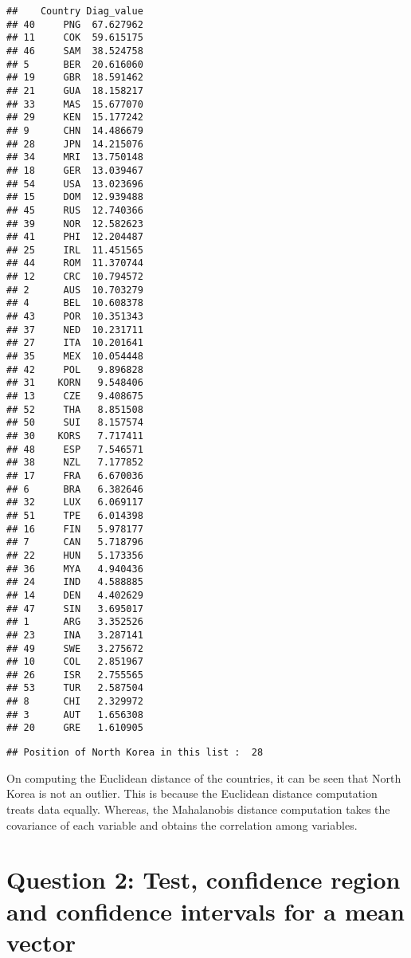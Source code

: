 \documentclass[]{article}
\newenvironment{Shaded}{\begin{snugshade}}{\end{snugshade}}
\newcommand{\KeywordTok}[1]{\textcolor[rgb]{0.13,0.29,0.53}{\textbf{#1}}}
\newcommand{\StringTok}[1]{\textcolor[rgb]{0.31,0.60,0.02}{#1}}
\newcommand{\OperatorTok}[1]{\textcolor[rgb]{0.81,0.36,0.00}{\textbf{#1}}}
\newcommand{\NormalTok}[1]{#1}
\begin{document}
\begin{verbatim}
##    Country Diag_value
## 40     PNG  67.627962
## 11     COK  59.615175
## 46     SAM  38.524758
## 5      BER  20.616060
## 19     GBR  18.591462
## 21     GUA  18.158217
## 33     MAS  15.677070
## 29     KEN  15.177242
## 9      CHN  14.486679
## 28     JPN  14.215076
## 34     MRI  13.750148
## 18     GER  13.039467
## 54     USA  13.023696
## 15     DOM  12.939488
## 45     RUS  12.740366
## 39     NOR  12.582623
## 41     PHI  12.204487
## 25     IRL  11.451565
## 44     ROM  11.370744
## 12     CRC  10.794572
## 2      AUS  10.703279
## 4      BEL  10.608378
## 43     POR  10.351343
## 37     NED  10.231711
## 27     ITA  10.201641
## 35     MEX  10.054448
## 42     POL   9.896828
## 31    KORN   9.548406
## 13     CZE   9.408675
## 52     THA   8.851508
## 50     SUI   8.157574
## 30    KORS   7.717411
## 48     ESP   7.546571
## 38     NZL   7.177852
## 17     FRA   6.670036
## 6      BRA   6.382646
## 32     LUX   6.069117
## 51     TPE   6.014398
## 16     FIN   5.978177
## 7      CAN   5.718796
## 22     HUN   5.173356
## 36     MYA   4.940436
## 24     IND   4.588885
## 14     DEN   4.402629
## 47     SIN   3.695017
## 1      ARG   3.352526
## 23     INA   3.287141
## 49     SWE   3.275672
## 10     COL   2.851967
## 26     ISR   2.755565
## 53     TUR   2.587504
## 8      CHI   2.329972
## 3      AUT   1.656308
## 20     GRE   1.610905
\end{verbatim}

\begin{Shaded}
\end{Shaded}

\begin{verbatim}
## Position of North Korea in this list :  28
\end{verbatim}

On computing the Euclidean distance of the countries, it can be seen
that North Korea is not an outlier. This is because the Euclidean
distance computation treats data equally. Whereas, the Mahalanobis
distance computation takes the covariance of each variable and obtains
the correlation among variables.

\section{Question 2: Test, confidence region and confidence intervals
for a mean
vector}\label{question-2-test-confidence-region-and-confidence-intervals-for-a-mean-vector}
\end{document}
